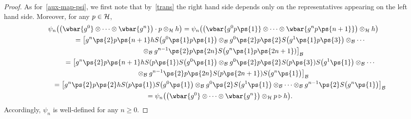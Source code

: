 \begin{proof}
As for~\eqref{aux-map-psi}, we f\/irst note that by~\eqref{trans} the right hand side depends only on the representatives
appearing on the left hand side.
Moreover, for any $p\in{\cal H}$,
\begin{gather*}
\psi_n\big(\big(\wbar{g^0}\otimes\cdots\otimes \wbar{g^n}\big)\cdot p\otimes_{\cal H} h \big)
=\psi_n\big(\big(\wbar{g^0p\ps{1}}\otimes\cdots\otimes \wbar{g^np\ps{n+1}}\big)\otimes_{\cal H} h \big)
\\
\qquad
=\big[g^n\ps{2}p\ps{n+1}hS\big(g^0\ps{1}p\ps{1}\big) \otimes_{\cal B} g^0\ps{2}p\ps{2}S\big(g^1\ps{1}p\ps{3}\big) \otimes_{\cal B} \cdots\\
\qquad\phantom{=}{}
\otimes_{\cal B} g^{n-1}\ps{2}p\ps{2n}S\big(g^n\ps{1}p\ps{2n+1})\big]_{\cal B}
\\
\qquad
=\big[g^n\ps{2}p\ps{n+1}hS(p\ps{1})S\big(g^0\ps{1}\big) \otimes_{\cal B} g^0\ps{2}p\ps{2}S(p\ps{3})S\big(g^1\ps{1}\big) \otimes_{\cal B}
\cdots
\\
\qquad\phantom{=}{}
\otimes_{\cal B} g^{n-1}\ps{2}p\ps{2n}S(p\ps{2n+1})S\big(g^n\ps{1}\big)\big]_{\cal B}
\\
\qquad
=\big[g^n\ps{2}p\ps{2}hS(p\ps{1})S\big(g^0\ps{1}\big) \otimes_{\cal B} g^0\ps{2}S\big(g^1\ps{1}\big) \otimes_{\cal B} \cdots \otimes_{\cal B}
g^{n-1}\ps{2}S\big(g^n\ps{1}\big)\big]_{\cal B}
\\
\qquad
=\psi_n\big(\big(\wbar{g^0}\otimes\cdots\otimes \wbar{g^n}\big)\otimes_{\cal H} p\triangleright h \big).
\end{gather*}
Accordingly, $\psi_n$ is well-def\/ined for any $n\geq 0$.


\end{proof}
